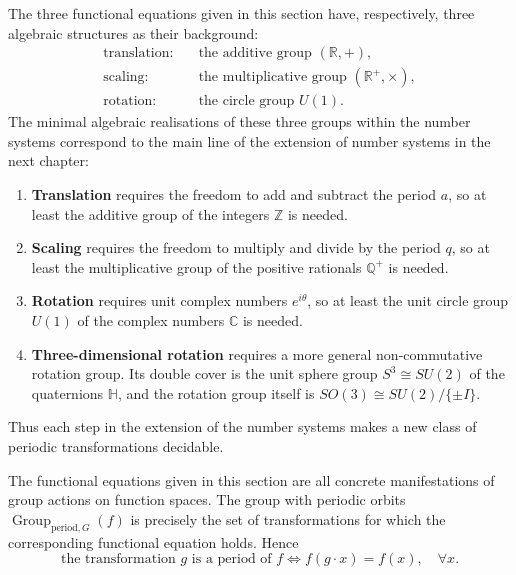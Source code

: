 \begin{remark}\label{rem:function_features_number_systems}
The three functional equations given in this section have, respectively, three algebraic structures as their background:
\[
\begin{aligned}
\text{translation:}&\quad\text{the additive group }(\mathbb{R},+),\\
\text{scaling:}&\quad\text{the multiplicative group }(\mathbb{R}^+,\times),\\
\text{rotation:}&\quad\text{the circle group }U(1).
\end{aligned}
\]
The minimal algebraic realisations of these three groups within the number systems correspond to the main line of the extension of number systems in the next chapter:
\begin{enumerate}[label=(\roman*)]
    \item \textbf{Translation} requires the freedom to add and subtract the period $a$, so at least the additive group of the integers $\mathbb{Z}$ is needed.
    \item \textbf{Scaling} requires the freedom to multiply and divide by the period $q$, so at least the multiplicative group of the positive rationals $\mathbb{Q}^+$ is needed.
    \item \textbf{Rotation} requires unit complex numbers $e^{i\theta}$, so at least the unit circle group $U(1)$ of the complex numbers $\mathbb{C}$ is needed.
    \item \textbf{Three-dimensional rotation} requires a more general non-commutative rotation group. Its double cover is the unit sphere group $S^3\cong SU(2)$ of the quaternions $\mathbb{H}$, and the rotation group itself is $SO(3)\cong SU(2)/\{\pm I\}$.
\end{enumerate}
Thus each step in the extension of the number systems makes a new class of periodic transformations decidable.
\end{remark}

\begin{remark}\label{rem:function_features_group_action}
The functional equations given in this section are all concrete manifestations of group actions on function spaces. The group with periodic orbits $\operatorname{Group}_{\mathrm{period},G}(f)$ is precisely the set of transformations for which the corresponding functional equation holds. Hence
\[
\text{the transformation }g\text{ is a period of }f
\iff
f(g\cdot x)=f(x),\quad \forall x.
\]
\end{remark}

